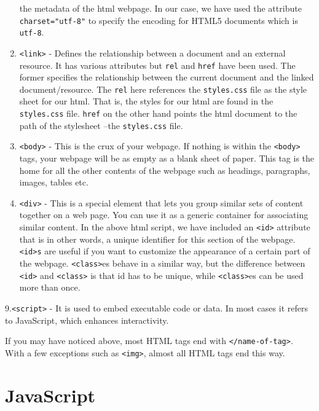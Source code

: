 \documentclass[
]{book}
\theoremstyle{definition}
\theoremstyle{definition}
\theoremstyle{definition}
\theoremstyle{definition}
\theoremstyle{remark}
\begin{document}
\begin{enumerate}
  the metadata of the html webpage. In our case, we have used the attribute \texttt{charset="utf-8"} to specify the encoding for HTML5 documents which is \texttt{utf-8}.
\item
  \texttt{\textless{}link\textgreater{}} - Defines the relationship between a document and an external resource. It has various attributes but \texttt{rel} and \texttt{href} have been used. The former specifies the relationship between the current document and the linked document/resource. The \texttt{rel} here references the \texttt{styles.css} file as the style sheet for our html. That is, the styles for our html are found in the \texttt{styles.css} file. \texttt{href} on the other hand points the html document to the path of the stylesheet --the \texttt{styles.css} file.
\item
  \texttt{\textless{}body\textgreater{}} - This is the crux of your webpage. If nothing is within the \texttt{\textless{}body\textgreater{}} tags, your webpage will be as empty as a blank sheet of paper. This tag is the home for all the other contents of the webpage such as headings, paragraphs, images, tables etc.
\item
  \texttt{\textless{}div\textgreater{}} - This is a special element that lets you group similar sets of content together on a web page. You can use it as a generic container for associating similar content. In the above html script, we have included an \texttt{\textless{}id\textgreater{}} attribute that is in other words, a unique identifier for this section of the webpage. \texttt{\textless{}id\textgreater{}s} are useful if you want to customize the appearance of a certain part of the webpage. \texttt{\textless{}class\textgreater{}}es behave in a similar way, but the difference between \texttt{\textless{}id\textgreater{}} and \texttt{\textless{}class\textgreater{}} is that id has to be unique, while \texttt{\textless{}class\textgreater{}}es can be used more than once.
\end{enumerate}

9.\texttt{\textless{}script\textgreater{}} - It is used to embed executable code or data. In most cases it refers to JavaScript, which enhances interactivity.

If you may have noticed above, most HTML tags end with \texttt{\textless{}/name-of-tag\textgreater{}}. With a few exceptions such as \texttt{\textless{}img\textgreater{}}, almost all HTML tags end this way.

\hypertarget{javascript}{%
\section{JavaScript}\label{javascript}}
\end{document}
